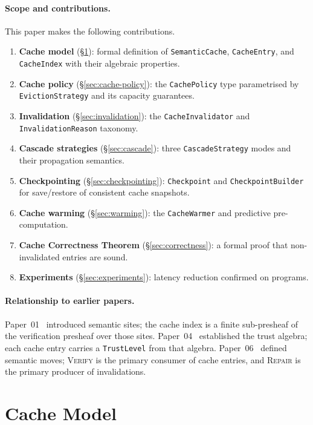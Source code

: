 \documentclass[11pt]{article}
\begin{document}
\paragraph{Scope and contributions.}
This paper makes the following contributions.
\begin{enumerate}[label=(\roman*)]
\item \textbf{Cache model} (\S\ref{sec:cache-model}): formal definition
  of \texttt{SemanticCache}, \texttt{CacheEntry}, and
  \texttt{CacheIndex} with their algebraic properties.
\item \textbf{Cache policy} (\S\ref{sec:cache-policy}): the
  \texttt{CachePolicy} type parametrised by \texttt{EvictionStrategy}
  and its capacity guarantees.
\item \textbf{Invalidation} (\S\ref{sec:invalidation}): the
  \texttt{CacheInvalidator} and \texttt{InvalidationReason} taxonomy.
\item \textbf{Cascade strategies} (\S\ref{sec:cascade}): three
  \texttt{CascadeStrategy} modes and their propagation semantics.
\item \textbf{Checkpointing} (\S\ref{sec:checkpointing}):
  \texttt{Checkpoint} and \texttt{CheckpointBuilder} for
  save/restore of consistent cache snapshots.
\item \textbf{Cache warming} (\S\ref{sec:warming}): the
  \texttt{CacheWarmer} and predictive pre-computation.
\item \textbf{Cache Correctness Theorem}
  (\S\ref{sec:correctness}): a formal proof that non-invalidated
  entries are sound.
\item \textbf{Experiments} (\S\ref{sec:experiments}): latency reduction
  confirmed on \expTotalPrograms{} programs.
\end{enumerate}

\paragraph{Relationship to earlier papers.}
Paper~01~\cite{jg01} introduced semantic sites; the cache index is a
finite sub-presheaf of the verification presheaf over those sites.
Paper~04~\cite{jg04} established the trust algebra; each cache entry
carries a \texttt{TrustLevel} from that algebra.  Paper~06~\cite{jg06}
defined semantic moves; \textsc{Verify} is the primary consumer of
cache entries, and \textsc{Repair} is the primary producer of
invalidations.

\section{Cache Model}\label{sec:cache-model}
\end{document}
